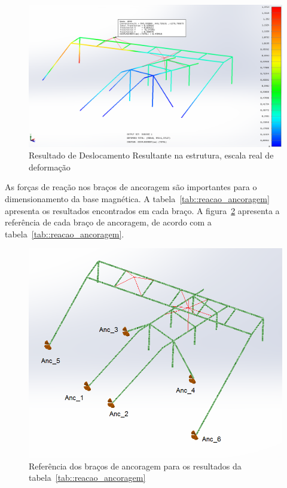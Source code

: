\begin{figure}[h!]
	\centering
	\includegraphics[width=0.9\columnwidth]{method/figs/dimensionamento/deslocamento}
	\caption{Resultado de Deslocamento Resultante na estrutura, escala real de
	deformação}
    \label{fig::deslocamento}
\end{figure}


As forças de reação nos braços de ancoragem são importantes para o
dimensionamento da base magnética. A tabela~\ref{tab::reacao_ancoragem}
apresenta os resultados encontrados em cada braço. A
figura~\ref{fig::mapa_forcas} apresenta a referência de cada braço de
ancoragem, de acordo com a tabela~\ref{tab::reacao_ancoragem}.

\begin{figure}[h!]
	\centering
	\includegraphics[width=0.8\columnwidth]{method/figs/dimensionamento/mapa_forcas}
	\caption{Referência dos braços de ancoragem para os resultados da
	tabela~\ref{tab::reacao_ancoragem}}
    \label{fig::mapa_forcas}
\end{figure}

